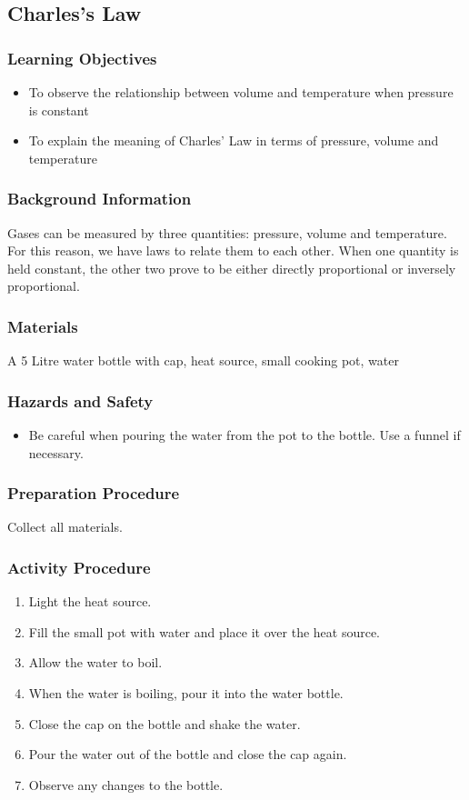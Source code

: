 \subsection{Charles's Law}

\subsubsection*{Learning Objectives}
\begin{itemize}
\item{To observe the relationship between volume and temperature when pressure is constant} 
\item{To explain the meaning of Charles' Law in terms of pressure, volume and temperature} 
\end{itemize}

\subsubsection*{Background Information}
Gases can be measured by three quantities: pressure, volume and temperature. For this reason, we have laws to relate them to each other. When one quantity is held constant, the other two prove to be either directly proportional or inversely proportional.  

\subsubsection*{Materials}
A 5 Litre water bottle with cap, heat source, small cooking pot, water

\subsubsection*{Hazards and Safety}
\begin{itemize}
\item{Be careful when pouring the water from the pot to the bottle. Use a funnel if necessary.} 
\end{itemize}

\subsubsection*{Preparation Procedure}
Collect all materials.

\subsubsection*{Activity Procedure}
\begin{enumerate}
\item{Light the heat source.} 
\item{Fill the small pot with water and place it over the heat source.} 
\item{Allow the water to boil.} 
\item{When the water is boiling, pour it into the water bottle.} 
\item{Close the cap on the bottle and shake the water.} 
\item{Pour the water out of the bottle and close the cap again.} 
\item{Observe any changes to the bottle.} 
\end{enumerate}

